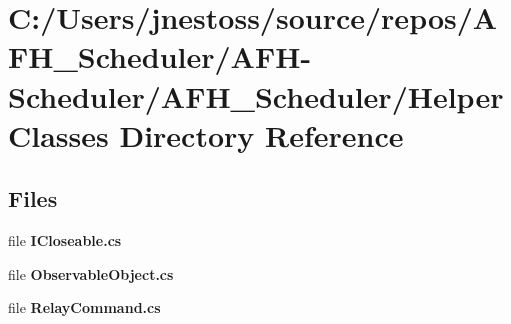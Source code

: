 \section{C\+:/\+Users/jnestoss/source/repos/\+A\+F\+H\+\_\+\+Scheduler/\+A\+F\+H-\/\+Scheduler/\+A\+F\+H\+\_\+\+Scheduler/\+Helper\+Classes Directory Reference}
\label{dir_37e9ed6e159b3c21cb874c58b4a62771}
\subsection*{Files}
\begin{DoxyCompactItemize}
\item 
file \textbf{ I\+Closeable.\+cs}
\item 
file \textbf{ Observable\+Object.\+cs}
\item 
file \textbf{ Relay\+Command.\+cs}
\end{DoxyCompactItemize}
